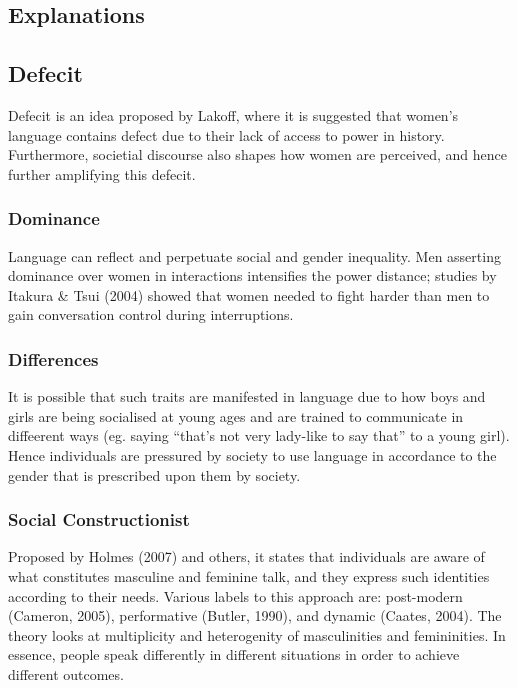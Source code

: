 \documentclass[../main.tex]{subfiles}
\begin{document}
        \subsection{Explanations}
            \subsection{Defecit}
            Defecit is an idea proposed by Lakoff, where it is suggested that women's language contains defect due to their lack of access to power in history. Furthermore, societial discourse also shapes how women are perceived, and hence further amplifying this defecit. 

            \subsubsection{Dominance}
            Language can reflect and perpetuate social and gender inequality. Men asserting dominance over women in interactions intensifies the power distance; studies by Itakura \& Tsui (2004) showed that women needed to fight harder than men to gain conversation control during interruptions.

            \subsubsection{Differences}
            It is possible that such traits are manifested in language due to how boys and girls are being socialised at young ages and are trained to communicate in diffeerent ways (eg. saying ``that's not very lady-like to say that'' to a young girl). Hence individuals are pressured by society to use language in accordance to the gender that is prescribed upon them by society. 

            \subsubsection{Social Constructionist}
            Proposed by Holmes (2007) and others, it states that individuals are aware of what constitutes masculine and feminine talk, and they express such identities according to their needs. Various labels to this approach are: post-modern (Cameron, 2005), performative (Butler, 1990), and dynamic (Caates, 2004). The theory looks at multiplicity and heterogenity of masculinities and femininities. In essence, people speak differently in different situations in order to achieve different outcomes.
\end{document}
